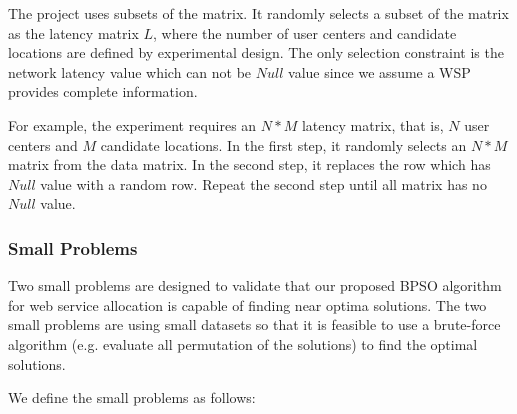 The project uses subsets of the matrix. 
It randomly selects a subset of the matrix as the latency matrix $L$, 
where the number of user centers and candidate locations are defined by experimental design. 
The only selection constraint is the network latency value which can not be $Null$ value since we assume a WSP provides complete information.

For example, the experiment requires an $N * M$ latency matrix, that is, $N$ user centers and $M$ candidate locations.
In the first step, it randomly selects an $N * M$ matrix from the data matrix. In the second step, it replaces the row which has $Null$ value with a random row. 
Repeat the second step until all matrix has no $Null$ value.
% 
% 
% 
% 

\subsubsection{Small Problems}
Two small problems are designed to validate that our proposed BPSO algorithm for web service allocation is capable of finding near optima solutions.
The two small problems are using small datasets so that it is feasible to use
a brute-force algorithm (e.g. evaluate all permutation of the solutions) to find the optimal solutions.

We define the small problems as follows:

